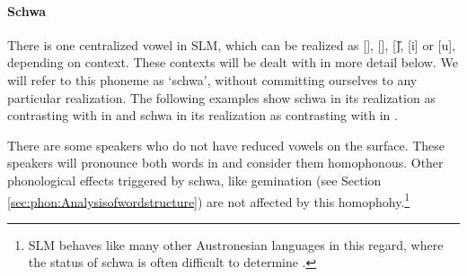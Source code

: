 % 

% 
% 
% 
% 



\paragraph{Schwa}
There is one centralized vowel in SLM, which can be realized as [\E], [\I], [\U], [i] or [u], depending on context. These contexts will be dealt with in more detail below. We will refer to this phoneme as `schwa', without committing ourselves to any particular realization. The following examples show schwa in its realization as  contrasting with  in  and schwa in its realization as  contrasting with  in .



There are some speakers who do not have reduced vowels on the surface. These speakers will pronounce both words in   and consider them homophonous. Other phonological effects triggered by schwa, like gemination (see Section \ref{sec:phon:Analysisofwordstructure}) are not affected by this homophohy.\footnote{SLM behaves like many other Austronesian languages in this regard, where the status of schwa is often difficult to determine \citep[116]{Himmelmann2005typochar}.}

